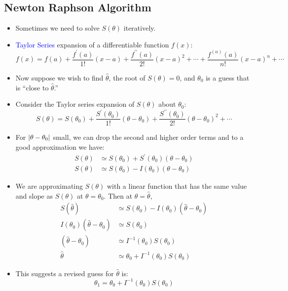 \documentclass[oneside]{book}\usepackage[]{graphicx}\usepackage[svgnames]{xcolor}
\DeclarePairedDelimiter\abs{\lvert}{\rvert}
\begin{document}
\subsection*{Newton Raphson Algorithm}
\begin{itemize}
      \item Sometimes we need to solve $ S(\theta) $ iteratively.
      \item \textcolor{Blue}{Taylor Series} expansion of a differentiable function $ f(x) $:
            \[ f(x)=f(a)+\frac{f^\prime(a)}{1!}(x-a)+\frac{f^{\prime\prime}(a)}{2!}(x-a)^2+\cdots+\frac{f^{(n)}(a)}{n!}(x-a)^n+\cdots  \]
      \item Now suppose we wish to find $ \hat{\theta} $, the root of $ S(\theta)=0 $, and $ \theta_0 $ is a guess that is ``close to $ \hat{\theta} $.''
      \item Consider the Taylor series expansion of $ S(\theta) $ about $ \theta_0 $:
            \[ S(\theta)=S(\theta_0)+\frac{S^\prime(\theta_0)}{1!}(\theta-\theta_0)+\frac{S^{\prime\prime}(\theta_0)}{2!}(\theta-\theta_0)^2+\cdots \]
      \item For $ \abs{\theta-\theta_0} $ small, we can drop the second and higher order terms and to a good approximation we have:
            \begin{align*}
                  S(\theta) & \simeq S(\theta_0)+S^\prime(\theta_0)(\theta-\theta_0) \\
                  S(\theta) & \simeq S(\theta_0)-I(\theta_0)(\theta-\theta_0)
            \end{align*}
      \item We are approximating $ S(\theta) $ with a linear function that has the same value and slope as $ S(\theta) $
            at $ \theta=\theta_0 $. Then at $ \theta=\hat{\theta} $,
            \begin{align*}
                  S(\hat{\theta})                    & \simeq S(\theta_0)-I(\theta_0)(\hat{\theta}-\theta_0) \\
                  I(\theta_0)(\hat{\theta}-\theta_0) & \simeq S(\theta_0)                                    \\
                  (\hat{\theta}-\theta_0)            & \simeq I^{-1}(\theta_0)S(\theta_0)                    \\
                  \hat{\theta}                       & \simeq \theta_0+I^{-1}(\theta_0)S(\theta_0)
            \end{align*}
      \item This suggests a revised guess for $ \hat{\theta} $ is:
            \[ \theta_1=\theta_0+I^{-1}(\theta_0)S(\theta_0) \]
\end{itemize}
\end{document}
